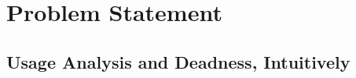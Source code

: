 \section{Problem Statement}
\label{sec:problem}


\subsection{Usage Analysis and Deadness, Intuitively}
\label{sec:usage-intuition}

